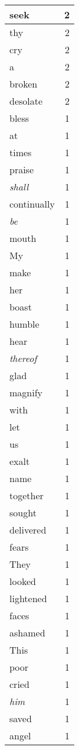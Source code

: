 \begin{center}
\begin{longtable}{l|r}
seek & 2 \\ \hline
thy & 2 \\ \hline
cry & 2 \\ \hline
a & 2 \\ \hline
broken & 2 \\ \hline
desolate & 2 \\ \hline
bless & 1 \\ \hline
at & 1 \\ \hline
times & 1 \\ \hline
praise & 1 \\ \hline
\emph{shall} & 1 \\ \hline
continually & 1 \\ \hline
\emph{be} & 1 \\ \hline
mouth & 1 \\ \hline
My & 1 \\ \hline
make & 1 \\ \hline
her & 1 \\ \hline
boast & 1 \\ \hline
humble & 1 \\ \hline
hear & 1 \\ \hline
\emph{thereof} & 1 \\ \hline
glad & 1 \\ \hline
magnify & 1 \\ \hline
with & 1 \\ \hline
let & 1 \\ \hline
us & 1 \\ \hline
exalt & 1 \\ \hline
name & 1 \\ \hline
together & 1 \\ \hline
sought & 1 \\ \hline
delivered & 1 \\ \hline
fears & 1 \\ \hline
They & 1 \\ \hline
looked & 1 \\ \hline
lightened & 1 \\ \hline
faces & 1 \\ \hline
ashamed & 1 \\ \hline
This & 1 \\ \hline
poor & 1 \\ \hline
cried & 1 \\ \hline
\emph{him} & 1 \\ \hline
saved & 1 \\ \hline
angel & 1 \\ \hline

\end{longtable}
\end{center}
